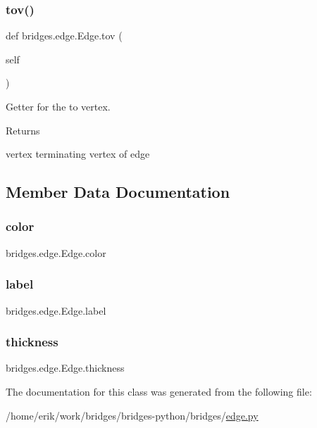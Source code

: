 \subsubsection{\texorpdfstring{tov()}{tov()}}
{\footnotesize\ttfamily def bridges.\+edge.\+Edge.\+tov (\begin{DoxyParamCaption}\item[{}]{self }\end{DoxyParamCaption})}



Getter for the to vertex. 

\begin{DoxyReturn}{Returns}


vertex terminating vertex of edge 
\end{DoxyReturn}


\subsection{Member Data Documentation}
\mbox{\label{classbridges_1_1edge_1_1_edge_ac54b17a05cab4803f7169dc6114cd9d9}} 
\subsubsection{\texorpdfstring{color}{color}}
{\footnotesize\ttfamily bridges.\+edge.\+Edge.\+color}

\mbox{\label{classbridges_1_1edge_1_1_edge_a20512d31b922b73872c168d7863bf7bf}} 
\subsubsection{\texorpdfstring{label}{label}}
{\footnotesize\ttfamily bridges.\+edge.\+Edge.\+label}

\mbox{\label{classbridges_1_1edge_1_1_edge_ac1fead90d70b6fce8392b4477388f22d}} 
\subsubsection{\texorpdfstring{thickness}{thickness}}
{\footnotesize\ttfamily bridges.\+edge.\+Edge.\+thickness}



The documentation for this class was generated from the following file\+:\begin{DoxyCompactItemize}
\item 
/home/erik/work/bridges/bridges-\/python/bridges/\hyperlink{edge_8py}{edge.\+py}\end{DoxyCompactItemize}
